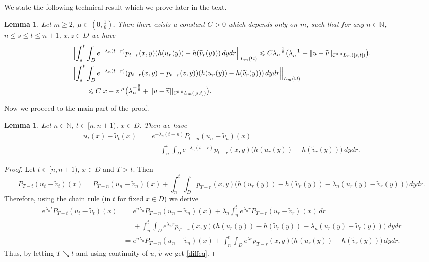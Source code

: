 \documentclass[12pt]{article}
\newtheorem{lemma}[theorem]{Lemma}
\theoremstyle{definition}
\DeclareMathOperator{\1}{\mathbbm{1}}%
\renewcommand{\ge}{\geqslant}
\renewcommand{\le}{\leqslant}
\newcommand{\nn}{\nonumber}
\newcommand{\wt}{\widetilde}
\newcommand{\C}{\mathcal{C}}
\newcommand{\N}{\mathbb{N}}
\begin{document}
We state the following technical result which we prove later in the text.
\begin{lemma}\label{L:main}
Let $m\ge2$,  $\mu\in(0,\frac16)$, Then there exists a constant $C>0$ which depends only on $m$, such that for any $n\in\N$, $n\le s \le t\le n+1$, $x,z\in D$  we have 
\begin{align}\label{sdeb2}
&\Bigl\|\int_s^t \int_D e^{-\lambda_n(t-r)}p_{t-r}(x,y)(h(u_r(y))-h(\wt v_r(y)))\,dy dr\Bigr\|_{L_m(\Omega)}\le  C\lambda_n^{-\frac18}\bigl(\lambda_n^{-1}+ \|u-\wt v\|_{\C^{0,0}L_m([s,t])}\bigr). \\
  	&\Bigl\|\int_s^t \int_D e^{-\lambda_n(t-r)}(p_{t-r}(x,y)-p_{t-r}(z,y))(h(u_r(y))-h(\wt v_r(y)))\,dy dr\Bigr\|_{L_m(\Omega)}\nn\\
	&\qquad\le 
	C |x-z|^{\mu} \bigl(\lambda_n^{-\frac98}+\|u-\wt v\|_{\C^{0,0}L_m([s,t])}\bigr). \label{sdeb3}
\end{align}
\end{lemma}

Now we proceed to the main part of the proof.
\begin{lemma}\label{l:diffl}
Let $n\in\N$, $t\in[n,n+1)$, $x\in D$. Then  we have 
\begin{align}\label{diffeq}
u_t(x)-\wt v_t(x)&=e^{-\lambda_n(t-n)} P_{t-n}(u_n-\wt v_n)(x)\nn\\
&\phantom{=}+ \int_n^t\int_D e^{-\lambda_n (t- r) } p_{t-r}(x,y)\bigl(h(u_r(y))-h(\wt v_r(y))\bigr)\,dy dr. 
\end{align}
\end{lemma}
\begin{proof}
Let $t\in[n,n+1)$, $x\in D$ and $T>t$. Then 
$$P_{T-t}(u_t-\wt v_t)(x)=P_{T-n}(u_n-\wt v_n)(x)+\int_n^t\int_D p_{T-r}(x,y) \bigl(h(u_r(y))-h(\wt v_r(y))-\lambda_n(u_r(y)-\wt v_r(y))\bigr)\,dydr.
$$ 
Therefore, using the chain rule (in $t$ for fixed $x\in D$) we derive 	
\begin{align*}
e^{\lambda_n t}P_{T-t}(u_t-\wt v_t)(x)&=e^{n \lambda_n } P_{T-n}(u_n-\wt v_n)(x)+
	\lambda_n\int_n^t e^{\lambda_n r } P_{T-r}(u_r-\wt v_r)(x)\,dr\\
		&\phantom{=}+
		\int_n^t\int_D e^{\lambda_n r } p_{T-r}(x,y) \bigl(h(u_r(y))-h(\wt v_r(y))-\lambda_n(u_r(y)-\wt v_r(y))\bigr)\,dydr\\
		&=e^{n \lambda_n } P_{T-n}(u_n-\wt v_n)(x)+ \int_n^t\int_D e^{\lambda r } p_{T-r}(x,y)\bigl(h(u_r(y))-h(\wt v_r(y))\bigr)\,dy dr. 
	\end{align*}
Thus, by letting $T\searrow t$ and using continuity of $u$, $\wt v$ we get \eqref{diffeq}.
\end{proof}
 
\end{document}
